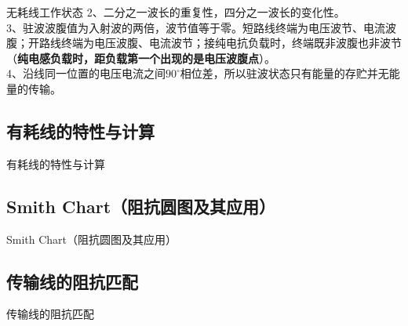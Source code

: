 \begin{frame}{无耗线工作状态}
  2、二分之一波长的重复性，四分之一波长的变化性。\\
  3、驻波波腹值为入射波的两倍，波节值等于零。短路线终端为电压波节、电流波腹；开路线终端为电压波腹、电流波节；接纯电抗负载时，终端既非波腹也非波节（\textbf{纯电感负载时，距负载第一个出现的是电压波腹点}）。\\
  4、沿线同一位置的电压电流之间$90^\circ$相位差，所以驻波状态只有能量的存贮并无能量的传输。
\end{frame}

\subsection{有耗线的特性与计算}
\begin{frame}{有耗线的特性与计算}

\end{frame}

\subsection{Smith Chart（阻抗圆图及其应用）}
\begin{frame}{Smith Chart（阻抗圆图及其应用）}

\end{frame}

\subsection{传输线的阻抗匹配}
\begin{frame}{传输线的阻抗匹配}

\end{frame}
